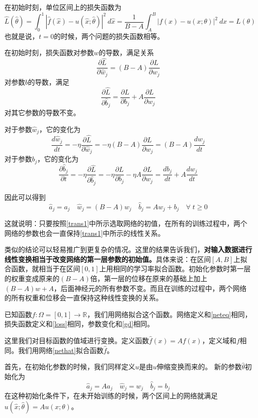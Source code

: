 在初始时刻，单位区间上的损失函数为
\begin{equation}\label{losshat}
\hat{L}(\hat{\theta}) = \int_{0}^{1} |\hat{f}(\hat{x}) - u(\hat{x}; \hat{\theta})|^2 \ d \hat{x} = \frac{1}{B-A} \int_{A}^{B} |f(x) - u(x; \theta)|^2 \ dx = L(\theta)
\end{equation}
也就是说，$t=0$的时候，两个问题的损失函数相等。

在初始时刻，损失函数对参数$w$的导数，满足关系
$$ \frac{\partial \hat{L}}{\partial \hat{w}_j} = (B-A) \frac{\partial L}{\partial w_j} $$
对参数$b$的导数，满足
$$ \frac{\partial \hat{L}}{\partial \hat{b}_j} = \frac{\partial L}{\partial b_j} + A \frac{\partial L}{\partial w_j} $$
对其它参数的导数不变。

对于参数$\hat{w}_j$，它的变化为
$$ \frac{d \hat{w}_j}{d t} = -\eta \frac{\partial \hat{L}}{\partial \hat{w}_j} = -\eta (B-A) \frac{\partial L}{\partial w_j} = (B-A) \frac{d w_j}{d t} $$
对于参数$\hat{b}_j$，它的变化为
$$ \frac{\partial \hat{b}_j}{\partial t} = -\eta \frac{\partial \hat{L}}{\partial \hat{b}_j} = -\eta \frac{\partial L}{\partial b_j} - \eta A \frac{\partial L}{\partial w_j} = \frac{d b_j}{d t} + A \frac{d w_j}{d t} $$

因此可以得到
$$ \hat{a}_j = a_j \quad \hat{w}_j = (B-A) w_j \quad \hat{b}_j = A w_j + b_j \quad \forall \; t \geq 0 $$

这就说明：只要按照\ref{trans1}中所示选取网络的初值，在所有的训练过程中，两个网络的参数也会一直保持\ref{trans1}中所示的线性关系。


类似的结论可以轻易推广到更复杂的情况。这里的结果告诉我们，\textbf{对输入数据进行线性变换相当于改变网络的第一层参数的初始值。}具体来说：在区间$[A,B]$上拟合函数，就相当于在区间$[0,1]$上用相同的学习率拟合函数。初始化参数时第一层的权重变成原来的$(B-A)$倍，第一层的位移在原来的基础上加上$(B-A)w+A$，后面神经元的所有参数不变。而且在训练的过程中，两个网络的所有权重和位移会一直保持这种线性变换的关系。


已知函数$f: \Omega = [0, 1] \rightarrow \mathbb{R}$，我们用网络拟合这个函数。网络定义和\ref{neteq}相同，损失函数定义和\ref{loss}相同，参数变化和\ref{gd}相同。

这里我们对目标函数的值域进行变换。定义函数$\hat{f}(x) = A f(x)$，定义域和$f$相同。我们用网络\ref{nethat}拟合函数$\hat{f}$。

首先，在初始化参数的时候，我们同样定义$\hat{u}$是由$u$伸缩变换而来的。
新的参数$\hat{\theta}$初始化为
\begin{equation}\label{trans2}
\hat{a}_j = A a_j \quad \hat{w}_j = w_j \quad \hat{b}_j = b_j
\end{equation}
在这种初始化条件下，在未开始训练的时候，两个区间上的网络就满足$\hat{u}(\hat{x}; \hat{\theta}) = A u(x; \theta)$。

